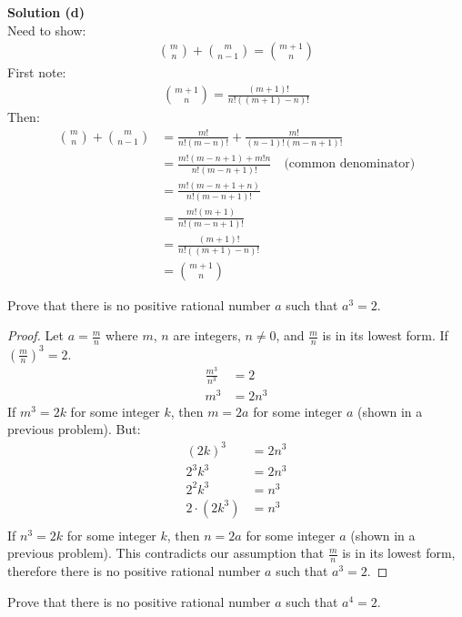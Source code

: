 \textbf{Solution (d)} \\
Need to show:
\begin{align*}
\binom{m}{n} + \binom{m}{n - 1} = \binom{m + 1}{n}
\end{align*}
First note: \\
\begin{align*}
\binom{m + 1}{n} = \frac{(m + 1)!}{n!((m + 1) - n)!}
\end{align*}
Then:
\begin{align*}
\binom{m}{n} + \binom{m}{n - 1}
&= \frac{m!}{n!(m - n)!} + \frac{m!}{(n - 1)!(m - n + 1)!} \\
&= \frac{m!(m - n + 1) + m!n}{n!(m - n + 1)!} \quad \text{(common denominator)} \\
&= \frac{m!(m - n + 1 + n)}{n!(m - n + 1)!} \\
&= \frac{m!(m + 1)}{n!(m - n + 1)!} \\
&= \frac{(m + 1)!}{n!((m + 1) - n)!} \\
&= \binom{m + 1}{n}
\end{align*}


\begin{tcolorbox}[title=Problem 8, breakable]
Prove that there is no positive rational number $a$ such that $a^3 = 2$.
\end{tcolorbox}

\begin{proof} Let $a = \frac{m}{n}$ where $m$, $n$ are integers, $n \not = 0$, and $\frac{m}{n}$
is in its lowest form. If ${(\frac{m}{n})}^3 = 2$.
\begin{align*}
\frac{m^3}{n^3} &= 2 \\
m^3 &= 2n^3 
\end{align*}
If $m^3 = 2k$ for some integer $k$, then $m = 2a$ for some integer $a$ (shown in a previous problem). 
But:
\begin{align*}
{(2k)}^3 &= 2n^3 \\
2^3k^3 &= 2n^3 \\
2^2k^3 &= n^3 \\
2 \cdot (2k^3) &= n^3 \\
\end{align*}
If $n^3 = 2k$ for some integer $k$, then $n = 2a$ for some integer $a$ (shown in a previous problem). 
This contradicts our assumption that $\frac{m}{n}$ is in its lowest form, therefore
there is no positive rational number $a$ such that $a^3 = 2$.
\end{proof}


\begin{tcolorbox}[title=Problem 9, breakable]
Prove that there is no positive rational number $a$ such that $a^4 = 2$.
\end{tcolorbox}

